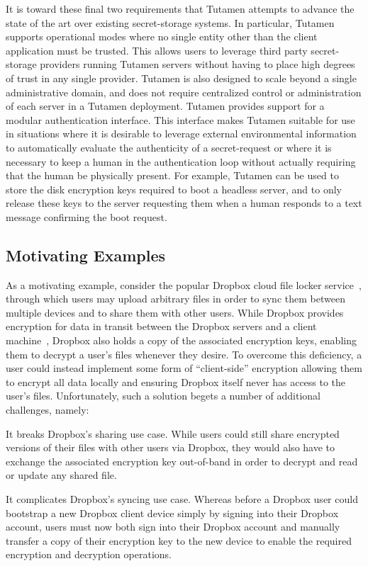 It is toward these final two requirements that Tutamen attempts to
advance the state of the art over existing secret-storage systems. In
particular, Tutamen supports operational modes where no single entity
other than the client application must be trusted. This allows users
to leverage third party secret-storage providers running Tutamen
servers without having to place high degrees of trust in any single
provider. Tutamen is also designed to scale beyond a single
administrative domain, and does not require centralized control or
administration of each server in a Tutamen deployment. Tutamen
provides support for a modular authentication interface. This
interface makes Tutamen suitable for use in situations where it is
desirable to leverage external environmental information to
automatically evaluate the authenticity of a secret-request or where
it is necessary to keep a human in the authentication loop without
actually requiring that the human be physically present. For example,
Tutamen can be used to store the disk encryption keys required to boot
a headless server, and to only release these keys to the server
requesting them when a human responds to a text message confirming the
boot request.

\subsection{Motivating Examples}

As a motivating example, consider the popular Dropbox cloud file
locker service~\cite{dropbox}, through which users may upload
arbitrary files in order to sync them between multiple devices and to
share them with other users. While Dropbox provides encryption for
data in transit between the Dropbox servers and a client
machine~\cite{dropbox-security}, Dropbox also holds a copy of the
associated encryption keys, enabling them to decrypt a user's files
whenever they desire. To overcome this deficiency, a user could
instead implement some form of ``client-side'' encryption allowing
them to encrypt all data locally and ensuring Dropbox itself never has
access to the user's files. Unfortunately, such a solution begets a
number of additional challenges, namely:

\begin{packed_enum}
\item It breaks Dropbox's sharing use case. While users could still
  share encrypted versions of their files with other users via
  Dropbox, they would also have to exchange the associated encryption
  key out-of-band in order to decrypt and read or update any shared
  file.
\item It complicates Dropbox's syncing use case. Whereas before a
  Dropbox user could bootstrap a new Dropbox client device simply by
  signing into their Dropbox account, users must now both sign into
  their Dropbox account and manually transfer a copy of their
  encryption key to the new device to enable the required encryption
  and decryption operations.
\end{packed_enum}

